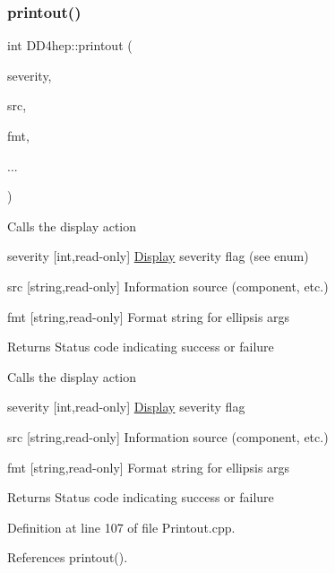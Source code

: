 \hypertarget{namespace_d_d4hep_a56158e35364c45902f21968cd334c53f}{}\label{namespace_d_d4hep_a56158e35364c45902f21968cd334c53f} 
\subsubsection{\texorpdfstring{printout()}{printout()}\hspace{0.1cm}{\footnotesize\ttfamily [2/8]}}
{\footnotesize\ttfamily int D\+D4hep\+::printout (\begin{DoxyParamCaption}\item[{\hyperlink{namespace_d_d4hep_a5b5a64d56252469451f2020a27d57d42}{Print\+Level}}]{severity,  }\item[{const std\+::string \&}]{src,  }\item[{const char $\ast$}]{fmt,  }\item[{}]{... }\end{DoxyParamCaption})}

Calls the display action \begin{DoxyItemize}
\item severity \mbox{[}int,read-\/only\mbox{]} \hyperlink{class_d_d4hep_1_1_display}{Display} severity flag (see enum) \item src \mbox{[}string,read-\/only\mbox{]} Information source (component, etc.) \item fmt \mbox{[}string,read-\/only\mbox{]} Format string for ellipsis args \begin{DoxyReturn}{Returns}
Status code indicating success or failure
\end{DoxyReturn}
Calls the display action \item severity \mbox{[}int,read-\/only\mbox{]} \hyperlink{class_d_d4hep_1_1_display}{Display} severity flag \item src \mbox{[}string,read-\/only\mbox{]} Information source (component, etc.) \item fmt \mbox{[}string,read-\/only\mbox{]} Format string for ellipsis args \begin{DoxyReturn}{Returns}
Status code indicating success or failure 
\end{DoxyReturn}
\end{DoxyItemize}


Definition at line 107 of file Printout.\+cpp.



References printout().

